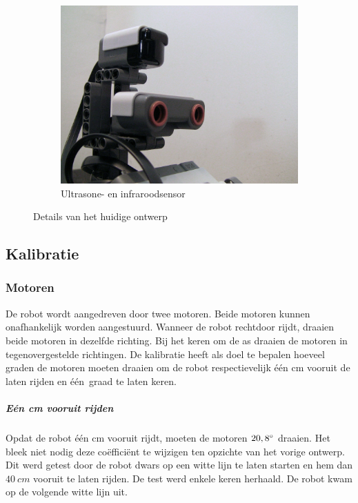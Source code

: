 \documentclass[eind]{penoverslag}
\begin{document}
\begin{figure}
\begin{subfigure}[h]{0.325\textwidth}
		\includegraphics[width=\textwidth]{robotSensoren}
		\caption{Ultrasone- en infraroodsensor}
	\end{subfigure}
\caption{Details van het huidige ontwerp}
\label{fig:robotDetail}
\end{figure}

\subsection{Kalibratie}
\label{ssec:Kalib}

\subsubsection{Motoren}
De robot wordt aangedreven door twee motoren. Beide motoren kunnen onafhankelijk worden aangestuurd. Wanneer de robot rechtdoor rijdt, draaien beide motoren in dezelfde richting. Bij het keren om de as draaien de motoren in tegenovergestelde richtingen. De kalibratie heeft als doel te bepalen hoeveel graden de motoren moeten draaien om de robot respectievelijk \'e\'en cm vooruit de laten rijden en \'e\'en~graad te laten keren.

\subparagraph{E\'en cm vooruit rijden}
Opdat de robot \'e\'en cm vooruit rijdt, moeten de motoren $20,8\degree$ draaien. Het bleek niet nodig deze co\"effici\"ent te wijzigen ten opzichte van het vorige ontwerp. Dit werd getest door de robot dwars op een witte lijn te laten starten en hem dan $40~cm$ vooruit te laten rijden. De test werd enkele keren herhaald. De robot kwam op de volgende witte lijn uit.
\end{document}
